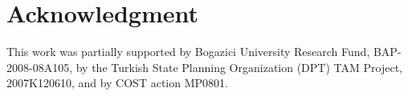 \documentclass[journal,comsoc]{IEEEtran}
\begin{document}
\section*{Acknowledgment}
This work was partially supported 
by Bogazici University Research Fund, BAP-2008-08A105, 
by the Turkish State Planning Organization (DPT) TAM Project, 2007K120610,
and
by COST action MP0801.








%
%



%
%
\end{document}
